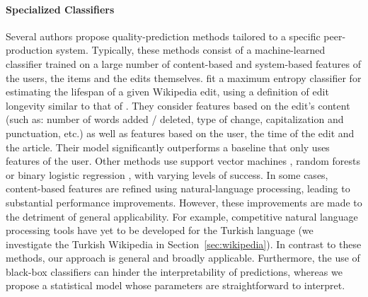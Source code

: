 \documentclass[format=sigconf]{acmart}
\begin{document}
\paragraph{Specialized Classifiers}
Several authors propose quality-prediction methods tailored to a specific peer-production system.
Typically, these methods consist of a machine-learned classifier trained on a large number of content-based and system-based features of the users, the items and the edits themselves.
\citet{druck2008learning} fit a maximum entropy classifier for estimating the lifespan of a given Wikipedia edit, using a definition of edit longevity similar to that of \citet{adler2007content}.
They consider features based on the edit's content (such as: number of words added / deleted, type of change, capitalization and punctuation, etc.) as well as features based on the user, the time of the edit and the article.
Their model significantly outperforms a baseline that only uses features of the user.
Other methods use support vector machines \citep{bronner2012user}, random forests \citep{bronner2012user, javanmardi2011vandalism} or binary logistic regression \citep{potthast2008automatic}, with varying levels of success.
In some cases, content-based features are refined using natural-language processing, leading to substantial performance improvements.
However, these improvements are made to the detriment of general applicability.
For example, competitive natural language processing tools have yet to be developed for the Turkish language (we investigate the Turkish Wikipedia in Section~\ref{sec:wikipedia}).
In contrast to these methods, our approach is general and broadly applicable.
Furthermore, the use of black-box classifiers can hinder the interpretability of predictions, whereas we propose a statistical model whose parameters are straightforward to interpret.
\end{document}
